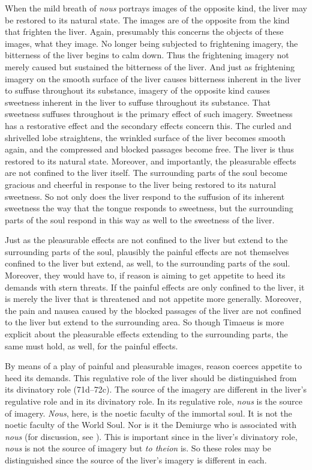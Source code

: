 When the mild breath of \emph{nous} portrays images of the opposite kind, the liver may be restored to its natural state. The images are of the opposite from the kind that frighten the liver. Again, presumably this concerns the objects of these images, what they image. No longer being subjected to frightening imagery, the bitterness of the liver begins to calm down. Thus the frightening imagery not merely caused but sustained the bitterness of the liver. And just as frightening imagery on the smooth surface of the liver causes bitterness inherent in the liver to suffuse throughout its substance, imagery of the opposite kind causes sweetness inherent in the liver to suffuse throughout its substance. That sweetness suffuses throughout is the primary effect of such imagery. Sweetness has a restorative effect and the secondary effects concern this. The curled and shrivelled lobe straightens, the wrinkled surface of the liver becomes smooth again, and the compressed and blocked passages become free. The liver is thus restored to its natural state. Moreover, and importantly, the pleasurable effects are not confined to the liver itself. The surrounding parts of the soul become gracious and cheerful in response to the liver being restored to its natural sweetness. So not only does the liver respond to the suffusion of its inherent sweetness the way that the tongue responds to sweetness, but the surrounding parts of the soul respond in this way as well to the sweetness of the liver. 

Just as the pleasurable effects are not confined to the liver but extend to the surrounding parts of the soul, plausibly the painful effects are not themselves confined to the liver but extend, as well, to the surrounding parts of the soul. Moreover, they would have to, if reason is aiming to get appetite to heed its demands with stern threats. If the painful effects are only confined to the liver, it is merely the liver that is threatened and not appetite more generally. Moreover, the pain and nausea caused by the blocked passages of the liver are not confined to the liver but extend to the surrounding area. So though Timaeus is more explicit about the pleasurable effects extending to the surrounding parts, the same must hold, as well, for the painful effects.

By means of a play of painful and pleasurable images, reason coerces appetite to heed its demands. This regulative role of the liver should be distinguished from its divinatory role (71d--72c). The source of the imagery are different in the liver's regulative role and in its divinatory role. In its regulative role, \emph{nous} is the source of imagery. \emph{Nous}, here, is the noetic faculty of the immortal soul. It is not the noetic faculty of the World Soul. Nor is it the Demiurge who is associated with \emph{nous} (for discussion, see \citealt{Menn:1995di}). This is important since in the liver's divinatory role, \emph{nous} is not the source of imagery but \emph{to theion} is. So these roles may be distinguished since the source of the liver's imagery is different in each. 

